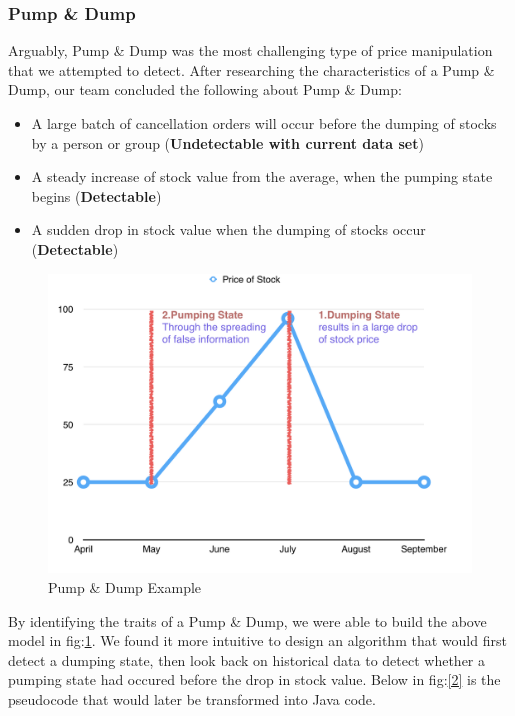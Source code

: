 \documentclass[12pt]{article}
\begin{document}
    \subsubsection{Pump \& Dump}
    Arguably, Pump \& Dump was the most challenging type of price manipulation that we attempted to detect.
    After researching the characteristics of a Pump \& Dump, our team concluded the following about Pump \& Dump:
    \begin{itemize}
      \item A large batch of cancellation orders will occur before the dumping of stocks by a person or group (\textbf{Undetectable with current data set})
      \item A steady increase of stock value from the average, when the pumping state begins (\textbf{Detectable})
      \item A sudden drop in stock value when the dumping of stocks occur (\textbf{Detectable})
    \end{itemize}
    \begin{figure}[H]
    \centering
    \includegraphics[width=130mm]{PumpDumpGraph.png}
    \caption{Pump \& Dump Example}
    \label{1}
    \end{figure}
    By identifying the traits of a Pump \& Dump, we were able to build the above model in fig:\ref{1}.
    We found it more intuitive to design an algorithm that would first detect a dumping state, then look back
    on historical data to detect whether a pumping state had occured before the drop in stock value. Below in fig:\ref{2} is the
    pseudocode that would later be transformed into Java code.
\end{document}
